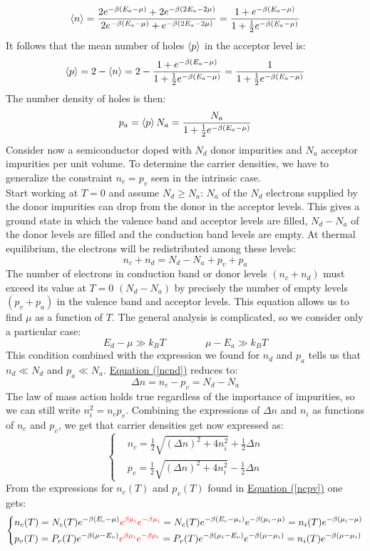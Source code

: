 \documentclass[10.75pt,a4paper,openright,bottom=2cm]{article}
\renewcommand{\refeq}[1]{\hyperref[#1]{Equation (\ref{#1})}}
\begin{document}
\[
\Braket{n}=\frac{2e^{-\beta(E_a-\mu)}+2e^{-\beta(2E_a-2\mu)}}{2e^{-\beta(E_a-\mu)}+e^{-\beta(2E_a-2\mu)}}=\frac{1+e^{-\beta(E_a-\mu)}}{1+\frac{1}{2}e^{-\beta(E_a-\mu)}}
\]
It follows that the mean number of holes $\Braket{p}$ in the acceptor level is:
\[
\Braket{p}=2-\Braket{n}=2-\frac{1+e^{-\beta(E_a-\mu)}}{1+\frac{1}{2}e^{-\beta(E_a-\mu)}}=\frac{1}{1+\frac{1}{2}e^{-\beta(E_a-\mu)}}
\]
The number density of holes is then:
\[
p_a=\Braket{p}N_a=\frac{N_a}{1+\frac{1}{2}e^{-\beta(E_a-\mu)}}
\]
Consider now a semiconductor doped with $N_d$ donor impurities and $N_a$ acceptor impurities per unit volume. To determine the carrier densities, we have to generalize the constraint $n_c=p_v$ seen in the intrinsic case.\\
Start working at $T=0$ and assume $N_d\ge N_a$: $N_a$ of the $N_d$ electrons supplied by the donor impurities can drop from the donor in the acceptor levels. This gives a ground state in which the valence band and acceptor levels are filled, $N_d-N_a$ of the donor levels are filled and the conduction band levels are empty. At thermal equilibrium, the electrons will be redistributed among these levels:
\begin{equation}
\label{ncnd}
n_c+n_d=N_d-N_a+p_v+p_a
\end{equation}
The number of electrons in conduction band or donor levels $(n_c+n_d)$ must exceed its value at $T=0$ $(N_d-N_a)$ by precisely the number of empty levels $(p_v+p_a)$ in the valence band and acceptor levels. This equation allows us to find $\mu$ as a function of $T$. The general analysis is complicated, so we consider only a particular case:
\[
E_d-\mu\gg k_BT \qquad \qquad \mu-E_a\gg k_BT
\]
This condition combined with the expression we found for $n_d$ and $p_a$ tells us that $n_d\ll N_d$ and $p_a\ll N_a$. \refeq{ncnd} reduces to:
\[
\Delta n=n_c-p_v=N_d-N_a
\]
The law of mass action holds true regardless of the importance of impurities, so we can still write $n_i^2=n_cp_v$. Combining the expressions of $\Delta n$ and $n_i$ as functions of $n_c$ and $p_v$, we get that carrier densities get now expressed as:
\[
\left\{
\begin{aligned}
&n_c=\frac{1}{2}\sqrt{(\Delta n)^2+4n_i^2}+\frac{1}{2}\Delta n\\
&p_v=\frac{1}{2}\sqrt{(\Delta n)^2+4n_i^2}-\frac{1}{2}\Delta n
\end{aligned}
\right.
\]
From the expressions for $n_c(T)$ and $p_v(T)$ found in \refeq{ncpv} one gets:
\[
\left\{
\begin{aligned}
&n_c(T)=N_c(T)e^{-\beta(E_c-\mu)}{\color{red}{e^{\beta\mu_i}e^{-\beta\mu_i}}}=N_c(T)e^{-\beta(E_c-\mu_i)}e^{-\beta(\mu_i-\mu)}=n_i(T)e^{-\beta(\mu_i-\mu)}\\
&p_v(T)=P_v(T)e^{-\beta(\mu-E_v)}{\color{red}{e^{\beta\mu_i}e^{-\beta\mu_i}}}=P_v(T)e^{-\beta(\mu_i-E_v)}e^{-\beta(\mu-\mu_i)}=n_i(T)e^{-\beta(\mu-\mu_i)}
\end{aligned}
\right.
\]
\end{document}
